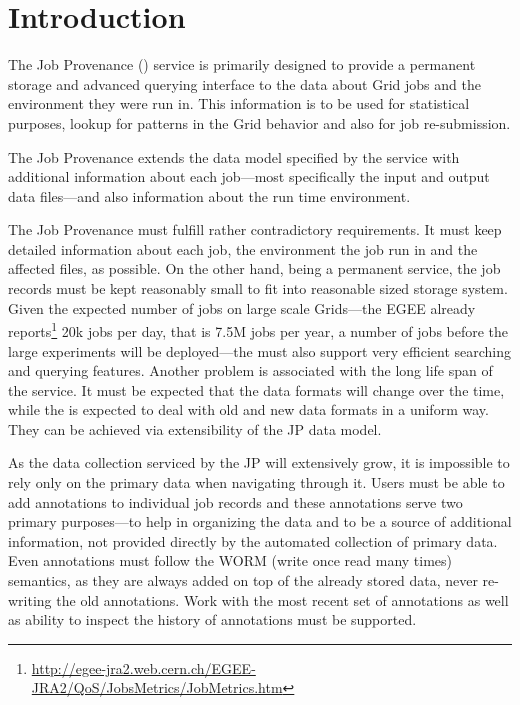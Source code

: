 \section{Introduction}

The Job Provenance (\JP) service is primarily designed to provide a permanent
storage and advanced querying interface to the data about Grid jobs and
the environment they were run in. This information is to be used for
statistical purposes, lookup for patterns in the Grid behavior and also
for job re-submission.

The Job Provenance extends the data model specified by the \LB service 
with additional information about each job---most specifically the input
and output data files---and also information about the run time
environment. 

The Job Provenance must fulfill rather contradictory requirements. It
must keep detailed information about each job, the environment the job
run in and the affected files, as possible. On the other hand, being a
permanent service, the job records must be kept reasonably small
to fit into reasonable sized storage system. Given the expected number of
jobs on large scale Grids---\eg the EGEE already
reports\footnote{\url{http://egee-jra2.web.cern.ch/EGEE-JRA2/QoS/JobsMetrics/JobMetrics.htm}}
20k jobs per day, that is 7.5M jobs per year, a number of jobs before the
large experiments will be deployed---the \JP must also support very
efficient searching and querying features. Another problem is associated
with the long life span of the \JP service. It must be expected that the
data formats will change over the time, while the \JP is expected to deal
with old and new data formats in a uniform way. They can be achieved via 
extensibility of the JP data model.

As the data collection serviced by the JP will extensively grow, it is
impossible to rely only on the primary data when navigating through it.
Users must be able to add annotations to individual job records and these
annotations serve two primary purposes---to help in organizing the \JP
data and to be a source of additional information, not provided directly
by the automated collection of primary data. Even annotations must follow
the WORM (write once read many times) semantics, as they are always added
on top of the already stored data, never re-writing the old annotations.
Work with the most recent set of annotations as well as ability to
inspect the history of annotations must be supported.

